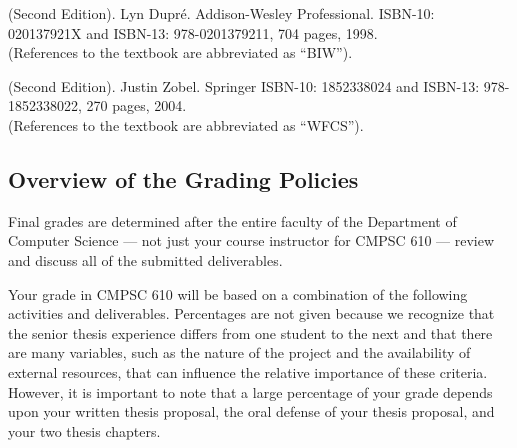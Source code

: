 \documentclass[11pt]{article}
\begin{document}
 (Second
Edition). Lyn Dupr\'e.  Addison-Wesley Professional.  ISBN-10: 020137921X and
ISBN-13: 978-0201379211, 704 pages, 1998.\\ (References to the textbook are
abbreviated as ``BIW'').

\vspace*{.1in}

 (Second Edition).  Justin Zobel.
Springer ISBN-10: 1852338024 and ISBN-13: 978-1852338022, 270 pages, 2004. \\
(References to the textbook are abbreviated as ``WFCS'').

\subsection*{Overview of the Grading Policies}

Final grades are determined after the entire faculty of the Department of
Computer Science --- not just your course instructor for CMPSC 610 --- review
and discuss all of the submitted deliverables.

Your grade in CMPSC 610 will be based on a combination of the following
activities and deliverables. Percentages are not given because we recognize that
the senior thesis experience differs from one student to the next and that there
are many variables, such as the nature of the project and the availability of
external resources, that can influence the relative importance of these
criteria. However, it is important to note that a large percentage of your grade
depends upon your written thesis proposal, the oral defense of your thesis
proposal, and your two thesis chapters.
\end{document}
